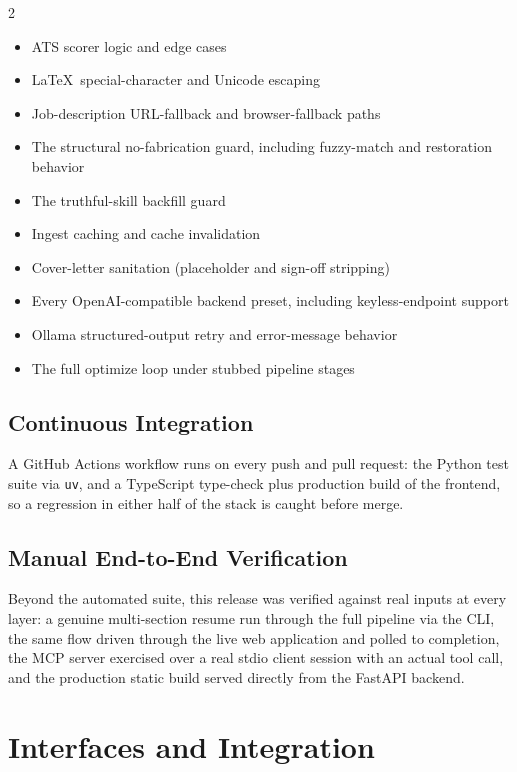 \documentclass[10.5pt,letterpaper]{article}
\begin{document}
\begin{multicols}{2}
\begin{itemize}
  \item ATS scorer logic and edge cases
  \item \LaTeX\ special-character and Unicode escaping
  \item Job-description URL-fallback and browser-fallback paths
  \item The structural no-fabrication guard, including fuzzy-match and restoration behavior
  \item The truthful-skill backfill guard
  \item Ingest caching and cache invalidation
  \item Cover-letter sanitation (placeholder and sign-off stripping)
  \item Every OpenAI-compatible backend preset, including keyless-endpoint support
  \item Ollama structured-output retry and error-message behavior
  \item The full optimize loop under stubbed pipeline stages
\end{itemize}
\end{multicols}

\subsection{Continuous Integration}
A GitHub Actions workflow runs on every push and pull request: the Python test suite via
\texttt{uv}, and a TypeScript type-check plus production build of the frontend, so a
regression in either half of the stack is caught before merge.

\subsection{Manual End-to-End Verification}
Beyond the automated suite, this release was verified against real inputs at every layer:
a genuine multi-section resume run through the full pipeline via the CLI, the same flow
driven through the live web application and polled to completion, the MCP server exercised
over a real stdio client session with an actual tool call, and the production static build
served directly from the FastAPI backend.

\newpage

\section{Interfaces and Integration}
\end{document}
